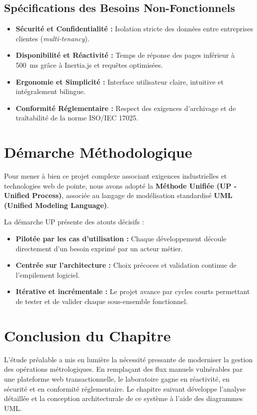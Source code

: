 \documentclass{bts-report}
\begin{document}
\subsection{Sp\'ecifications des Besoins Non-Fonctionnels}
\begin{itemize}
  \item \textbf{S\'ecurit\'e et Confidentialit\'e :} Isolation stricte des donn\'ees entre entreprises clientes (\textit{multi-tenancy}).
  \item \textbf{Disponibilit\'e et R\'eactivit\'e :} Temps de r\'eponse des pages inf\'erieur \`a 500~ms gr\^ace \`a Inertia.js et requ\^etes optimis\'ees.
  \item \textbf{Ergonomie et Simplicit\'e :} Interface utilisateur claire, intuitive et int\'egralement bilingue.
  \item \textbf{Conformit\'e R\'eglementaire :} Respect des exigences d'archivage et de tra\^itabilit\'e de la norme ISO/IEC 17025.
\end{itemize}

\section{D\'emarche M\'ethodologique}
Pour mener \`a bien ce projet complexe associant exigences industrielles et technologies web de pointe, nous avons adopt\'e la \textbf{M\'ethode Unifi\'ee (UP - Unified Process)}, associ\'ee au langage de mod\'elisation standardis\'e \textbf{UML (Unified Modeling Language)}. 

La d\'emarche UP pr\'esente des atouts d\'ecisifs :
\begin{itemize}
  \item \textbf{Pilot\'ee par les cas d'utilisation :} Chaque d\'eveloppement d\'ecoule directement d'un besoin exprim\'e par un acteur m\'etier.
  \item \textbf{Centr\'ee sur l'architecture :} Choix pr\'ecoces et validation continue de l'empilement logiciel.
  \item \textbf{It\'erative et incr\'ementale :} Le projet avance par cycles courts permettant de tester et de valider chaque sous-ensemble fonctionnel.
\end{itemize}

\section*{Conclusion du Chapitre}
L'\'etude pr\'ealable a mis en lumi\`ere la n\'ecessit\'e pressante de moderniser la gestion des op\'erations m\'etrologiques. En rempla\c{c}ant des flux manuels vuln\'erables par une plateforme web transactionnelle, le laboratoire gagne en r\'eactivit\'e, en s\'ecurit\'e et en conformit\'e r\'eglementaire. Le chapitre suivant d\'eveloppe l'analyse d\'etaill\'ee et la conception architecturale de ce syst\`eme \`a l'aide des diagrammes UML.
\end{document}

